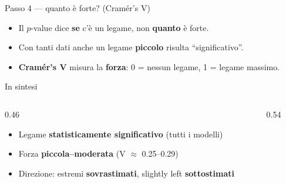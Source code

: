 \documentclass[aspectratio=169]{beamer}
\newcommand{\hl}[1]{\textbf{#1}}
\begin{document}
\begin{frame}{Passo 4 --- quanto \`e forte? (Cram\'er's V)}
  \vfill
  \begin{itemize}[<+->]
    \setlength\itemsep{0.9em}
    \item Il $p$-value dice \hl{se} c'\`e un legame, non \hl{quanto} \`e forte.
    \item Con tanti dati anche un legame \hl{piccolo} risulta ``significativo''.
    \item \hl{Cram\'er's V} misura la \hl{forza}: 0 = nessun legame, 1 = legame massimo.
  \end{itemize}
  \vfill
\end{frame}

\begin{frame}{In sintesi}
  \begin{columns}[c]
    \begin{column}{0.46\textwidth}
      \begin{itemize}[<+->]
        \setlength\itemsep{0.9em}
        \item Legame \hl{statisticamente significativo} (tutti i modelli)
        \item Forza \hl{piccola--moderata} (V $\approx$ 0.25--0.29)
        \item Direzione: estremi \hl{sovrastimati}, slightly left \hl{sottostimati}
      \end{itemize}
    \end{column}
    \begin{column}{0.54\textwidth}
    \end{column}
  \end{columns}
\end{frame}
\end{document}

